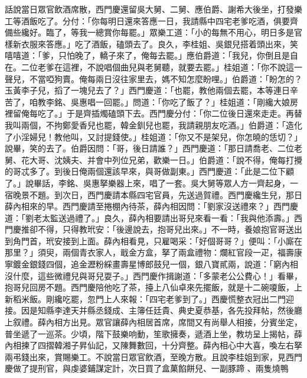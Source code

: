 \begin{showcontents}{}
話說當日眾官飲酒席散，西門慶還留吳大舅、二舅、應伯爵、謝希大後坐，打發樂工等酒飯吃了。分付：「你每明日還來答應一日，我請縣中四宅老爹吃酒，俱要齊備些纔好。臨了，等我一總賞你每罷。」眾樂工道：「小的每無不用心，明日多是官樣新衣服來答應。」吃了酒飯，磕頭去了。良久，李桂姐、吳銀兒搭着頭出來，笑嘻嘻道：「爹，只怕晚了，轎子來了，俺每去罷。」應伯爵道：「我兒，你倒且是自在。二位老爹在這裡，不說唱個曲兒與老舅聽，就要去罷。」桂姐道：「你不說這一聲兒，不當啞狗賣。俺每兩日沒往家里去，媽不知怎麼盼哩。」伯爵道：「盼怎的？玉黃李子兒，搯了一塊兒去了？」西門慶道：「也罷，教他兩個去罷，本等連日辛苦了，咱教李銘、吳惠唱一回罷。」問道：「你吃了飯了？」桂姐道：「剛纔大娘房裡留俺每吃了。」于是齊插燭磕頭下去。西門慶分付：「你二位後日還來走走。再替我叫兩個，不拘鄭愛香兒也罷，韓金釧兒也罷，我請親朋友吃酒。」伯爵道：「造化了小淫婦兒！教他叫，又討提錢使。」桂姐道：「你又不是架兒，你怎曉的恁切？」說畢，笑的去了。伯爵因問：「哥，後日請誰？」西門慶道：「那日請喬老、二位老舅、花大哥、沈姨夫、并會中列位兄弟，歡樂一日。」伯爵道：「說不得，俺每打攪的哥忒多了。到後日俺兩個還該早來，與哥做副東。」西門慶道：「此是二位下顧了。」說畢話，李銘、吳惠拏樂器上來，唱了一套。吳大舅等眾人方一齊起身，一宿晚景不題。到次日，西門慶請本縣四宅官員，先送過賀禮。西門慶纔生兒，那日薛內相來的早。西門慶請至捲棚內待茶，薛內相因問：「劉家沒送禮來？」西門慶道：「劉老太監送過禮了。」良久，薛內相要請出哥兒來看一看：「我與他添壽。」西門慶推卻不得，只得教玳安：「後邊說去，抱哥兒出來。」不一時，養娘抱官哥送出到角門首，玳安接到上面。薛內相看見，只雇喝采：「好個哥哥？」便叫：「小廝在那里？」須臾，兩個青衣家人，戢金方盒，拏了兩盒禮物：爛紅官段一疋，福壽康寧鍍金銀錢四個，追金瀝粉綵畫壽星博郎鼓兒一個，銀八寶貳兩，說道：「窮內相沒什麼，這些微禮兒與哥兒耍子。」西門慶作揖謝道：「多蒙老公公費心！」看畢，抱哥兒回房不題。西門慶陪他吃了茶，擡上八仙卓來先擺飯，就是十二碗嗄飯，上新稻米飯。剛纔吃罷，忽門上人來報：「四宅老爹到了。」西慶慌整衣冠出二門迎接。因是知縣李達天并縣丞錢成、主簿任廷貴、典史夏恭基，各先投拜帖，然後廳上叙禮。薛內相方出見。眾官讓薛內相居首席，席間又有尚舉人相接，分賓坐定，普坐遞了一巡茶。少頃，階下鼓樂响動，笙歌擁奏，遞酒上坐，教坊呈上揭帖，薛內相揀了四摺韓湘子昇仙記，又陳舞數回，十分齊整。薛內相心中大喜，喚左右拏兩弔錢出來，賞賜樂工。不說當日眾官飲酒，至晚方散。且說李桂姐到家，見西門慶做了提刑官，與虔婆鋪謀定計，次日買了盒菓餡餅兒、一副豚蹄 、兩隻燒鴨 
\end{showcontents}
